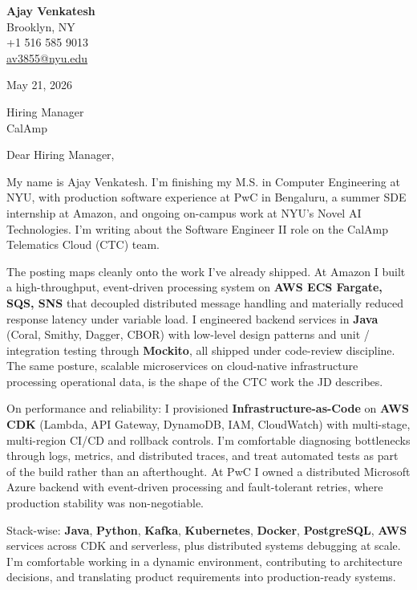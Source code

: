 \documentclass[letterpaper,11pt]{article}
\begin{document}
\begin{flushleft}
\textbf{\large Ajay Venkatesh} \\
Brooklyn, NY \\
+1 516 585 9013 \\
\href{mailto:av3855@nyu.edu}{av3855@nyu.edu}
\end{flushleft}
\vspace{10pt}
May 21, 2026
\vspace{6pt}

Hiring Manager \\
CalAmp

\vspace{10pt}

Dear Hiring Manager,

My name is Ajay Venkatesh. I'm finishing my M.S. in Computer Engineering at NYU, with production software experience at PwC in Bengaluru, a summer SDE internship at Amazon, and ongoing on-campus work at NYU's Novel AI Technologies. I'm writing about the Software Engineer II role on the CalAmp Telematics Cloud (CTC) team.

The posting maps cleanly onto the work I've already shipped. At Amazon I built a high-throughput, event-driven processing system on \textbf{AWS ECS Fargate, SQS, SNS} that decoupled distributed message handling and materially reduced response latency under variable load. I engineered backend services in \textbf{Java} (Coral, Smithy, Dagger, CBOR) with low-level design patterns and unit / integration testing through \textbf{Mockito}, all shipped under code-review discipline. The same posture, scalable microservices on cloud-native infrastructure processing operational data, is the shape of the CTC work the JD describes.

On performance and reliability: I provisioned \textbf{Infrastructure-as-Code} on \textbf{AWS CDK} (Lambda, API Gateway, DynamoDB, IAM, CloudWatch) with multi-stage, multi-region CI/CD and rollback controls. I'm comfortable diagnosing bottlenecks through logs, metrics, and distributed traces, and treat automated tests as part of the build rather than an afterthought. At PwC I owned a distributed Microsoft Azure backend with event-driven processing and fault-tolerant retries, where production stability was non-negotiable.

Stack-wise: \textbf{Java}, \textbf{Python}, \textbf{Kafka}, \textbf{Kubernetes}, \textbf{Docker}, \textbf{PostgreSQL}, \textbf{AWS} services across CDK and serverless, plus distributed systems debugging at scale. I'm comfortable working in a dynamic environment, contributing to architecture decisions, and translating product requirements into production-ready systems.
\end{document}

